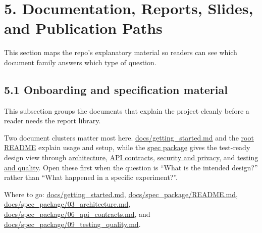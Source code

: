 \section{5. Documentation, Reports, Slides, and Publication
Paths}\label{documentation-reports-slides-and-publication-paths}

This section maps the repo's explanatory material so readers can see
which document family answers which type of question.

\subsection{5.1 Onboarding and specification
material}\label{onboarding-and-specification-material}

This subsection groups the documents that explain the project cleanly
before a reader needs the report library.

Two document clusters matter most here.
\href{https://github.com/chris-page-gov/mcp-geo/blob/fe862910da246ca77f374cfbe484985f5df4d316/docs/getting_started.md}{docs/getting\_started.md}
and the
\href{https://github.com/chris-page-gov/mcp-geo/blob/fe862910da246ca77f374cfbe484985f5df4d316/README.md\#L20-L240}{root
README} explain usage and setup, while the
\href{https://github.com/chris-page-gov/mcp-geo/tree/fe862910da246ca77f374cfbe484985f5df4d316/docs/spec_package}{spec
package} gives the test-ready design view through
\href{https://github.com/chris-page-gov/mcp-geo/blob/fe862910da246ca77f374cfbe484985f5df4d316/docs/spec_package/03_architecture.md}{architecture},
\href{https://github.com/chris-page-gov/mcp-geo/blob/fe862910da246ca77f374cfbe484985f5df4d316/docs/spec_package/06_api_contracts.md}{API
contracts},
\href{https://github.com/chris-page-gov/mcp-geo/blob/fe862910da246ca77f374cfbe484985f5df4d316/docs/spec_package/07_security_privacy.md}{security
and privacy}, and
\href{https://github.com/chris-page-gov/mcp-geo/blob/fe862910da246ca77f374cfbe484985f5df4d316/docs/spec_package/09_testing_quality.md}{testing
and quality}. Open these first when the question is ``What is the
intended design?'' rather than ``What happened in a specific
experiment?''.

Where to go:
\href{https://github.com/chris-page-gov/mcp-geo/blob/fe862910da246ca77f374cfbe484985f5df4d316/docs/getting_started.md}{docs/getting\_started.md},
\href{https://github.com/chris-page-gov/mcp-geo/blob/fe862910da246ca77f374cfbe484985f5df4d316/docs/spec_package/README.md\#L1-L45}{docs/spec\_package/README.md},
\href{https://github.com/chris-page-gov/mcp-geo/blob/fe862910da246ca77f374cfbe484985f5df4d316/docs/spec_package/03_architecture.md}{docs/spec\_package/03\_architecture.md},
\href{https://github.com/chris-page-gov/mcp-geo/blob/fe862910da246ca77f374cfbe484985f5df4d316/docs/spec_package/06_api_contracts.md}{docs/spec\_package/06\_api\_contracts.md},
and
\href{https://github.com/chris-page-gov/mcp-geo/blob/fe862910da246ca77f374cfbe484985f5df4d316/docs/spec_package/09_testing_quality.md}{docs/spec\_package/09\_testing\_quality.md}.

